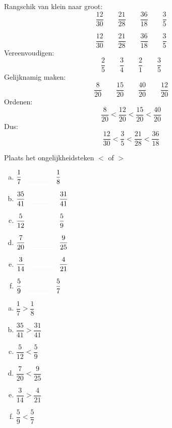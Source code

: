 \documentclass[12pt]{article}
\begin{document}
\begin{exercise}
Rangschik van klein naar groot:
$$\dfrac{12}{30} \qquad \dfrac{21}{28} \qquad \dfrac{36}{18} \qquad \dfrac{3}{5}$$
\end{exercise}

\begin{solution}
$$\dfrac{12}{30} \qquad \dfrac{21}{28} \qquad \dfrac{36}{18} \qquad \dfrac{3}{5}$$
Vereenvoudigen:
$$\dfrac{2}{5} \qquad \dfrac{3}{4} \qquad \dfrac{2}{1} \qquad \dfrac{3}{5}$$
Gelijknamig maken:
$$\dfrac{8}{20} \qquad \dfrac{15}{20} \qquad \dfrac{40}{20} \qquad \dfrac{12}{20}$$
Ordenen:
$$\dfrac{8}{20}  < \dfrac{12}{20} < \dfrac{15}{20} < \dfrac{40}{20}$$
Dus:
$$\dfrac{12}{30}  < \dfrac{3}{5} < \dfrac{21}{28} < \dfrac{36}{18}$$
\end{solution}

\begin{exercise}
Plaats het ongelijkheidsteken $<$ of $>$
\begin{multicols}{2}
\begin{enumerate}[(a)]
  \item $\dfrac{1}{7} \quad\arule{1cm}\quad \dfrac{1}{8}$
  \item $\dfrac{35}{41} \quad\arule{1cm}\quad \dfrac{31}{41}$
  \item $\dfrac{5}{12} \quad\arule{1cm}\quad \dfrac{5}{9}$
  \item $\dfrac{7}{20} \quad\arule{1cm}\quad \dfrac{9}{25}$
  \item $\dfrac{3}{14} \quad\arule{1cm}\quad \dfrac{4}{21}$
  \item $\dfrac{5}{9} \quad\arule{1cm}\quad \dfrac{5}{7}$
\end{enumerate}
\end{multicols}
\end{exercise}

\begin{solution}
\begin{multicols}{2}
\begin{enumerate}[(a)]
  \item $\dfrac{1}{7} > \dfrac{1}{8}$
  \item $\dfrac{35}{41} > \dfrac{31}{41}$
  \item $\dfrac{5}{12} < \dfrac{5}{9}$
  \item $\dfrac{7}{20} < \dfrac{9}{25}$
  \item $\dfrac{3}{14} > \dfrac{4}{21}$
  \item $\dfrac{5}{9} < \dfrac{5}{7}$
\end{enumerate}
\end{multicols}
\end{solution}
\end{document}
